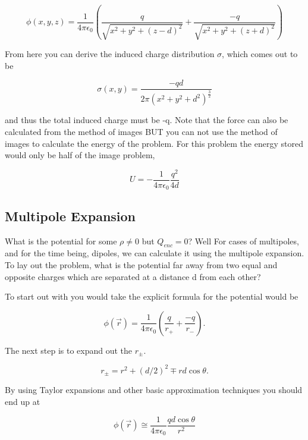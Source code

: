 \documentclass[preprint, review,12pt]{elsarticle}
\def\k{\frac{1}{4 \pi \epsilon_0}}
\begin{document}
\begin{equation}
    \phi(x,y,z) = \frac{1}{4 \pi \epsilon_0}(\frac{q}{\sqrt{x^2+y^2+(z-d)^2}} + \frac{-q}{\sqrt{x^2+y^2+(z+d)^2}})
\end{equation}

From here you can derive the induced charge distribution $\sigma$, which comes out to be

\begin{equation}
    \sigma(x,y) = \frac{-qd}{2\pi (x^2+y^2+d^2)^{\frac{3}{2}}}
\end{equation}

and thus the total induced charge must be -q. Note that the force can also be calculated from the method of images BUT you can not use the method of images to calculate the energy of the problem. For this problem the energy stored would only be half of the image problem,

\begin{equation}
    U = -\k\frac{q^2}{4d}
\end{equation}

\subsection{Multipole Expansion}

What is the potential for some $\rho \neq 0$ but $Q_{enc} = 0$? Well For cases of multipoles, and for the time being, dipoles, we can calculate it using the multipole expansion. To lay out the problem, what is the potential far away from two equal and opposite charges which are separated at a distance d from each other?

To start out with you would take the explicit formula for the potential would be 

\begin{equation}
    \phi(\vec{r}) = \frac{1}{4\pi \epsilon_0}(\frac{q}{r_+}+\frac{-q}{r_-}).
\end{equation}

The next step is to expand out the $r_\pm$.

\begin{equation}
    r_\pm = r^2 + (d/2)^2 \mp rd\cos\theta.
\end{equation}

By using Taylor expansions and other basic approximation techniques you should end up at

\begin{equation}
    \phi(\vec{r}) \cong \k \frac{qd\cos\theta}{r^2}
\end{equation}
\end{document}
